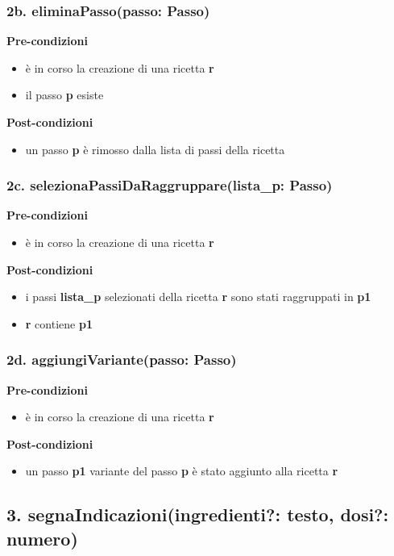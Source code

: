 \documentclass[14pt]{extarticle}
\begin{document}
\subsubsection*{2b. eliminaPasso(passo: Passo)}

\textbf{Pre-condizioni}
\begin{itemize}
  \item è in corso la creazione di una ricetta  \textbf{r}
  \item il passo  \textbf{p} esiste
\end{itemize}
\textbf{Post-condizioni}
\begin{itemize}
  \item un passo  \textbf{p} è rimosso dalla lista di passi della ricetta
\end{itemize}

\subsubsection*{2c. selezionaPassiDaRaggruppare(lista\_p: Passo)}

\textbf{Pre-condizioni}
\begin{itemize}
  \item è in corso la creazione di una ricetta  \textbf{r}
\end{itemize}
\textbf{Post-condizioni}
\begin{itemize}
  \item i passi  \textbf{lista\_p} selezionati della ricetta  \textbf{r} sono stati raggruppati in  \textbf{p1}
  \item  \textbf{r} contiene  \textbf{p1}
\end{itemize}

\subsubsection*{2d. aggiungiVariante(passo: Passo)}

\textbf{Pre-condizioni}
\begin{itemize}
  \item è in corso la creazione di una ricetta  \textbf{r}
\end{itemize}
\textbf{Post-condizioni}
\begin{itemize}
  \item un passo  \textbf{p1} variante del passo  \textbf{p} è stato aggiunto alla ricetta  \textbf{r}
\end{itemize}

\subsection*{3. segnaIndicazioni(ingredienti?: testo, dosi?: numero)}
\end{document}
